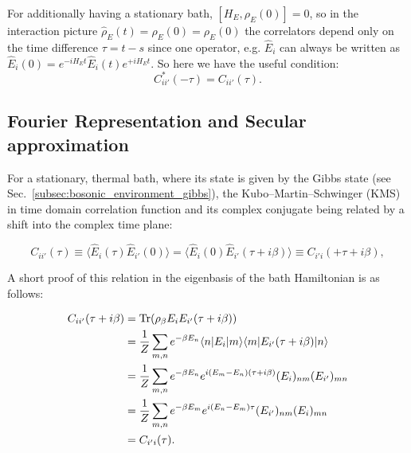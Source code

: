 \noindent
{}

\noindent
For additionally having a stationary bath, $[H_E, \rho_E(0)]=0$, so in the interaction picture $\hat{\rho}_E(t)=\hat{\rho}_E(0)=\rho_E(0)$ the correlators depend only on the time difference $\tau= t - s$ since one operator, e.g. $\hat{E}_{i}$ can always be written as $\hat{E}_{i}(0) = e^{-i H_E t} \hat{E}_i(t) e^{+i H_E t}$. So here we have the useful condition:
\begin{equation}
	C^{*}_{ii'}(-\tau) = C_{ii'}(\tau).
\end{equation}


\subsection{Fourier Representation and Secular approximation}
\label{subsec:Fourier_and_secular}

\noindent
For a stationary, thermal bath, where its state is given by the Gibbs state (see Sec.~\ref{subsec:bosonic_environment_gibbs}), the Kubo--Martin--Schwinger (KMS) in time domain  correlation function and its complex conjugate being related by a shift into the complex time plane:

\begin{equation}
	C_{ii'}(\tau) \equiv \langle \hat{E}_{i}(\tau) \hat{E}_{i'}(0) \rangle  =  \langle \hat{E}_{i}(0) \hat{E}_{i'}(\tau + i \beta) \rangle  \equiv C_{i'i}(+\tau + i \beta),
	\label{eq:kms_time_relation}
\end{equation}

\noindent
A short proof of this relation in the eigenbasis of the bath Hamiltonian is as follows:

\begin{align}
	C_{ii'}(\tau + i \beta) &= \mathrm{Tr}(\rho_\beta E_i E_{i'}(\tau + i \beta)) \notag \\
	&= \frac{1}{Z} \sum_{m,n} e^{-\beta E_n} \langle n | E_i | m \rangle \langle m | E_{i'}(\tau + i \beta) | n \rangle \notag \\
	&= \frac{1}{Z} \sum_{m,n} e^{-\beta E_n} e^{i(E_m - E_n)(\tau + i \beta)} (E_i)_{nm} (E_{i'})_{mn} \notag \\
	&= \frac{1}{Z} \sum_{m,n} e^{-\beta E_m} e^{i(E_n - E_m)\tau} (E_{i'})_{nm} (E_i)_{mn} \notag \\
	&= C_{i'i}(\tau).
\end{align}



